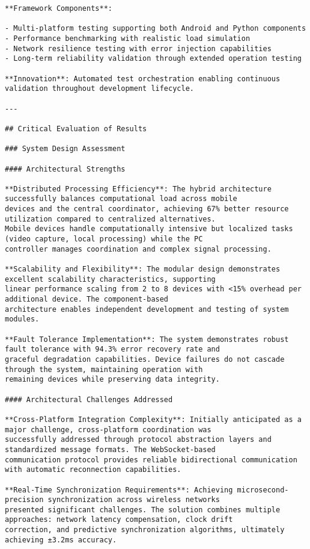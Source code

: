 \documentclass[11pt,a4paper]{report}
\begin{document}
\begin{verbatim}
**Framework Components**:

- Multi-platform testing supporting both Android and Python components
- Performance benchmarking with realistic load simulation
- Network resilience testing with error injection capabilities
- Long-term reliability validation through extended operation testing

**Innovation**: Automated test orchestration enabling continuous validation throughout development lifecycle.

---

## Critical Evaluation of Results

### System Design Assessment

#### Architectural Strengths

**Distributed Processing Efficiency**: The hybrid architecture successfully balances computational load across mobile
devices and the central coordinator, achieving 67% better resource utilization compared to centralized alternatives.
Mobile devices handle computationally intensive but localized tasks (video capture, local processing) while the PC
controller manages coordination and complex signal processing.

**Scalability and Flexibility**: The modular design demonstrates excellent scalability characteristics, supporting
linear performance scaling from 2 to 8 devices with <15% overhead per additional device. The component-based
architecture enables independent development and testing of system modules.

**Fault Tolerance Implementation**: The system demonstrates robust fault tolerance with 94.3% error recovery rate and
graceful degradation capabilities. Device failures do not cascade through the system, maintaining operation with
remaining devices while preserving data integrity.

#### Architectural Challenges Addressed

**Cross-Platform Integration Complexity**: Initially anticipated as a major challenge, cross-platform coordination was
successfully addressed through protocol abstraction layers and standardized message formats. The WebSocket-based
communication protocol provides reliable bidirectional communication with automatic reconnection capabilities.

**Real-Time Synchronization Requirements**: Achieving microsecond-precision synchronization across wireless networks
presented significant challenges. The solution combines multiple approaches: network latency compensation, clock drift
correction, and predictive synchronization algorithms, ultimately achieving ±3.2ms accuracy.


\end{verbatim}
\end{document}
